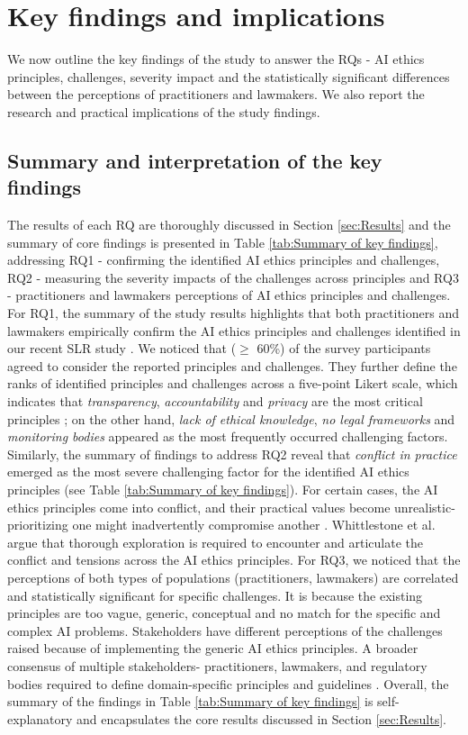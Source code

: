 \section{Key findings and implications}
We now outline the key findings of the study to answer the RQs - AI ethics principles, challenges, severity impact and the statistically significant differences between the perceptions of practitioners and lawmakers. We also report the research and practical implications of the study findings.

\subsection{Summary and interpretation of the key findings}
The results of each RQ are thoroughly discussed in Section \ref{sec:Results} and the summary of core findings is presented in Table \ref{tab:Summary of key findings}, addressing RQ1 - confirming the identified AI ethics principles and challenges, RQ2 - measuring the severity impacts of the challenges across principles and RQ3 - practitioners and lawmakers perceptions of AI ethics principles and challenges. For RQ1, the summary of the study results highlights that both practitioners and lawmakers empirically confirm the AI ethics principles and challenges identified in our recent SLR study \cite{AR13}. We noticed that ($\geq$ 60\%) of the survey participants agreed to consider the reported principles and challenges. They further define the ranks of identified principles and challenges across a five-point Likert scale, which indicates that \textit{transparency}, \textit{accountability} and \textit{privacy} are the most critical principles \cite{AR15}\cite{AR10}; on the other hand, \textit{lack of ethical knowledge}, \textit{no legal frameworks} and \textit{monitoring bodies} appeared as the most frequently occurred challenging factors. Similarly, the summary of findings to address RQ2 reveal that \textit{conflict in practice} emerged as the most severe challenging factor for the identified AI ethics principles (see Table \ref{tab:Summary of key findings}). For certain cases, the AI ethics principles come into conflict, and their practical values become unrealistic- prioritizing one might inadvertently compromise another \cite{whittlestone2019role}. Whittlestone et al. \cite{whittlestone2019role} argue that thorough exploration is required to encounter and articulate the conflict and tensions across the AI ethics principles. For RQ3, we noticed that the perceptions of both types of populations (practitioners, lawmakers) are correlated and statistically significant for specific challenges. It is because the existing principles are too vague, generic, conceptual and no match for the specific and complex AI problems. Stakeholders have different perceptions of the challenges raised because of implementing the generic AI ethics principles. A broader consensus of multiple stakeholders- practitioners, lawmakers, and regulatory bodies required to define domain-specific principles and guidelines \cite{whittlestone2019role}. Overall, the summary of the findings in Table \ref{tab:Summary of key findings} is self-explanatory and encapsulates the core results discussed in Section \ref{sec:Results}.

